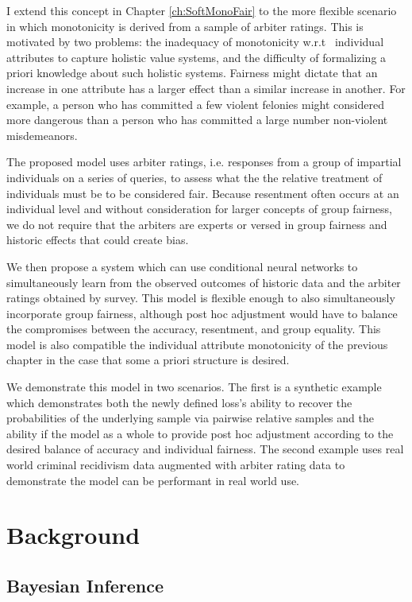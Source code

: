 I extend this concept in Chapter \ref{ch:SoftMonoFair} to the more flexible scenario in which monotonicity is derived from a sample of arbiter ratings. This is motivated by two problems: the inadequacy of monotonicity w.r.t~ individual attributes to capture holistic value systems, and the difficulty of formalizing a priori knowledge about such holistic systems. Fairness might dictate that an increase in one attribute has a larger effect than a similar increase in another.  For example, a person who has committed a few violent felonies might considered more dangerous than a person who has committed a large number non-violent misdemeanors.

The proposed model uses arbiter ratings, i.e. responses from a group of impartial individuals on a series of queries, to assess what the the relative treatment of individuals must be to be considered fair.  Because resentment often occurs at an individual level and without consideration for larger concepts of group fairness, we do not require that the arbiters are experts or versed in group fairness and historic effects that could create bias.

We then propose a system which can use conditional neural networks to simultaneously learn from the observed outcomes of historic data and the arbiter ratings obtained by survey.  This model is flexible enough to also simultaneously incorporate group fairness, although post hoc adjustment would have to balance the compromises between the accuracy, resentment, and group equality.  This model is also compatible the individual attribute monotonicity of the previous chapter in the case that some a priori structure is desired.

We demonstrate this model in two scenarios.  The first is a synthetic example which demonstrates both the newly defined loss's ability to recover the probabilities of the underlying sample via pairwise relative samples and the ability if the model as a whole to provide post hoc adjustment according to the desired balance of accuracy and individual fairness.  The second example uses real world criminal recidivism data augmented with arbiter rating data to demonstrate the model can be performant in real world use.

\section{Background}

    \subsection{Bayesian Inference} \label{sec:intro_bayes}
    
